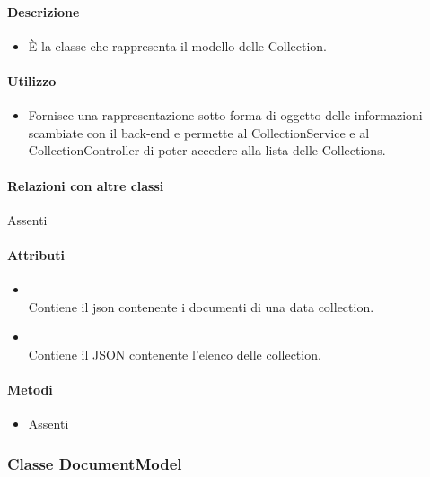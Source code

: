 \paragraph*{Descrizione}
\begin{itemize}
\item[] È la classe che rappresenta il modello delle Collection.
\end{itemize}

\paragraph*{Utilizzo}
\begin{itemize}
\item[] Fornisce una rappresentazione sotto forma di oggetto delle informazioni scambiate con il back-end e permette al CollectionService e al CollectionController di poter accedere alla lista delle Collections.
\end{itemize}

\paragraph*{Relazioni con altre classi}
Assenti

\paragraph*{Attributi}
\begin{itemize}
\item[]  \\ Contiene il json contenente i documenti di una data collection.
\item[]  \\ Contiene il JSON contenente l'elenco delle collection.
\end{itemize}

\paragraph*{Metodi}
\begin{itemize}
\item[] Assenti
\end{itemize}

\subsubsection{Classe DocumentModel}

